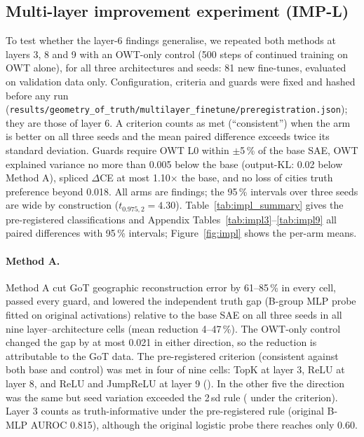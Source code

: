 \subsection{Multi-layer improvement experiment (IMP-L)}\label{sec:impl}
To test whether the layer-6 findings generalise, we repeated both methods at layers 3, 8 and 9 with an OWT-only
control (500 steps of continued training on OWT alone), for all three architectures and seeds: 81 new fine-tunes,
evaluated on validation data only. Configuration, criteria and guards were fixed and hashed before any run
(\texttt{results/\allowbreak{}geometry\_of\_truth/\allowbreak{}multilayer\_finetune/\allowbreak{}preregistration.json}); they are those of layer 6. A
criterion counts as met (``consistent'') when the arm is better on all three seeds and the mean paired difference
exceeds twice its standard deviation. Guards require OWT L0 within $\pm$5\,\% of the base SAE, OWT explained variance
no more than 0.005 below the base (output-KL: 0.02 below Method A), spliced $\Delta$CE at most 1.10$\times$ the base, and
no loss of cities truth preference beyond 0.018. All arms are  findings; the 95\,\% intervals over
three seeds are wide by construction ($t_{0.975,2}=4.30$). Table~\ref{tab:impl_summary} gives the pre-registered
classifications and Appendix Tables~\ref{tab:impl3}--\ref{tab:impl9} all paired differences with 95\,\% intervals; Figure~\ref{fig:impl} shows the
per-arm means.

\paragraph{Method A.} Method A cut GoT geographic reconstruction error by 61--85\,\% in every cell, passed every guard,
and lowered the independent truth gap (B-group MLP probe fitted on original activations) relative to the base SAE on
all three seeds in all nine layer--architecture cells (mean reduction 4--47\,\%). The OWT-only control changed the gap by
at most 0.021 in either direction, so the reduction is attributable to the GoT data. The pre-registered criterion
(consistent against both base and control) was met in four of nine cells: TopK at layer 3, ReLU at layer 8, and ReLU
and JumpReLU at layer 9 (). In the other five the direction was the same but seed
variation exceeded the 2\,sd rule ( under the criterion). Layer 3 counts as truth-informative
under the pre-registered rule (original B-MLP AUROC 0.815), although the original logistic probe there reaches only 0.60.

